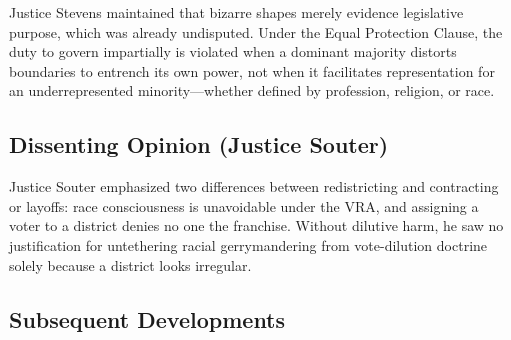 \documentclass[12pt]{article}
\begin{document}
Justice Stevens maintained that bizarre shapes merely evidence legislative purpose, which was already undisputed. Under the Equal Protection Clause, the duty to govern impartially is violated when a dominant majority distorts boundaries to entrench its own power, not when it facilitates representation for an underrepresented minority---whether defined by profession, religion, or race.

\subsection{Dissenting Opinion (Justice Souter)}

Justice Souter emphasized two differences between redistricting and contracting or layoffs: race consciousness is unavoidable under the VRA, and assigning a voter to a district denies no one the franchise. Without dilutive harm, he saw no justification for untethering racial gerrymandering from vote-dilution doctrine solely because a district looks irregular.

\subsection{Subsequent Developments}
\end{document}
